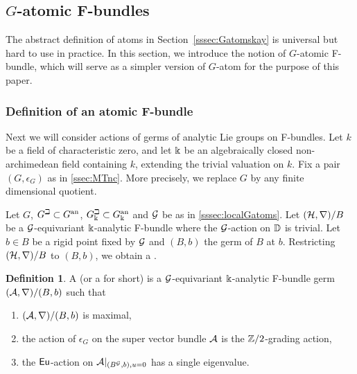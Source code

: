 \documentclass[twoside,leqno]{article}
\numberwithin{equation}{section}
\theoremstyle{plain}
\theoremstyle{definition}
\newtheorem{definition}[equation]{Definition}
\begin{document}
\medskip


\subsection{\texorpdfstring{$G$}{G}-atomic F-bundles} \label{ssec:GatomicF}

The abstract definition of atoms in Section~\ref{sssec:Gatomskay} is universal but hard to use in practice.
In this section, we introduce the notion of $G$-atomic F-bundle, which will serve as a simpler version of $G$-atom for the purpose of this paper.

\subsubsection{Definition of an atomic F-bundle} \label{sssec:defatomicF}

Next we will consider actions of germs of analytic Lie groups on F-bundles.
Let $k$ be a field of characteristic zero, and let $\Bbbk$ be  an algebraically closed non-archimedean field containing $k$,  extending the trivial valuation on $k$.
Fix a pair $(G,\epsilon_{G})$ as in \cref{ssec:MTnc}.
More precisely, we replace $G$ by any finite dimensional quotient.





Let $G$, $G^\beth \subset G^{\mathrm{an}}$, $G_\Bbbk^\beth \subset G_\Bbbk^{\mathrm{an}}$ and $\mathcal{G}$ be as in \cref{sssec:localGatoms}.
Let $(\mathcal H,\nabla)/B$ be a $\mathcal{G}$-equivariant $\Bbbk$-analytic F-bundle where the $\mathcal{G}$-action on $\mathbb D$ is trivial.
Let $b \in B$ be a rigid point fixed by $\mathcal{G}$ and $(B,b)$ the germ of $B$ at $b$.
Restricting $(\mathcal H,\nabla)/B$ to $(B,b)$, we obtain a .

\begin{definition} \label{def:GatomicFbundle}
A  (or a  for short) is a $\mathcal{G}$-equivariant $\Bbbk$-analytic F-bundle germ $(\mathcal A,\nabla)/(B,b)$ such that 
    \begin{enumerate}[wide]
        \item $(\mathcal A,\nabla)/(B,b)$ is maximal, 
        \item the action of $\epsilon_{G}$ on the super vector bundle $\mathcal A$ is the $\mathbb Z/2$-grading action, 
        \item the $\operatorname{\mathsf{Eu}}$-action on $\mathcal A|_{(B^{\mathcal{G}},b), u = 0}$ has a single eigenvalue.
    \end{enumerate}
\end{definition}
\end{document}
